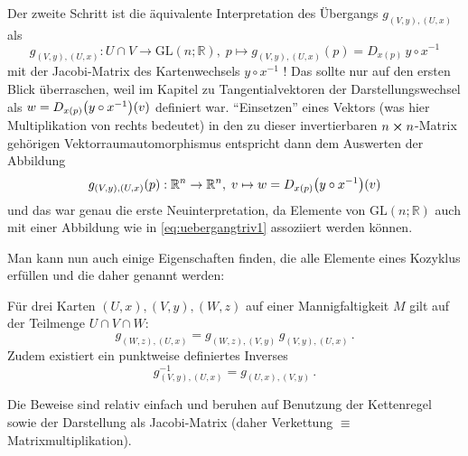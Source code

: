 \documentclass[../H_Analysis_main.tex]{subfiles}
\begin{document}
Der zweite Schritt ist die äquivalente Interpretation des Übergangs $g_{(V, y), (U, x)}$ als
\begin{equation}
g_{(V, y), (U, x)}: U \cap V \rightarrow \text{GL}(n; \mathbb{R}), \; p \mapsto g_{(V, y), (U, x)}(p) = D_{x(p)} \, y \circ x^{-1}
\end{equation}
mit der Jacobi-Matrix des Kartenwechsels $y \circ x^{-1}$ ! Das sollte nur auf den ersten Blick überraschen, weil im Kapitel zu Tangentialvektoren der Darstellungswechsel als $w = D_{x(p)}\qty(y \circ x^{-1})(v)$ definiert war. \enquote{Einsetzen} eines Vektors (was hier Multiplikation von rechts bedeutet) in den zu dieser invertierbaren $n \cross n$-Matrix gehörigen Vektorraumautomorphismus entspricht dann dem Auswerten der Abbildung
\begin{equation}
g_{(V, y), (U, x)}(p): \mathbb{R}^n \rightarrow \mathbb{R}^n, \; v \mapsto w = D_{x(p)}\qty(y \circ x^{-1})(v)
\end{equation}
und das war genau die erste Neuinterpretation, da Elemente von $\text{GL}(n; \mathbb{R})$ auch mit einer Abbildung wie in \eqref{eq:uebergangtriv1} assoziiert werden können.





Man kann nun auch einige Eigenschaften finden, die alle Elemente eines Kozyklus erfüllen und die daher  genannt werden:
\begin{satz}
Für drei Karten $(U, x), (V, y), (W, z)$ auf einer Mannigfaltigkeit $M$ gilt auf der Teilmenge $U \cap V \cap W$:%
\begin{equation}
g_{(W, z), (U, x)} = g_{(W, z), (V, y)} \, g_{(V, y), (U, x)} \, .
\end{equation}
Zudem existiert ein punktweise definiertes Inverses
\begin{equation}
g^{-1}_{(V, y), (U, x)} = g_{(U, x), (V, y)} \, .
\end{equation}
\end{satz}
Die Beweise sind relativ einfach und beruhen auf Benutzung der Kettenregel sowie der Darstellung als Jacobi-Matrix (daher Verkettung $\equiv$ Matrixmultiplikation).\\
\end{document}
